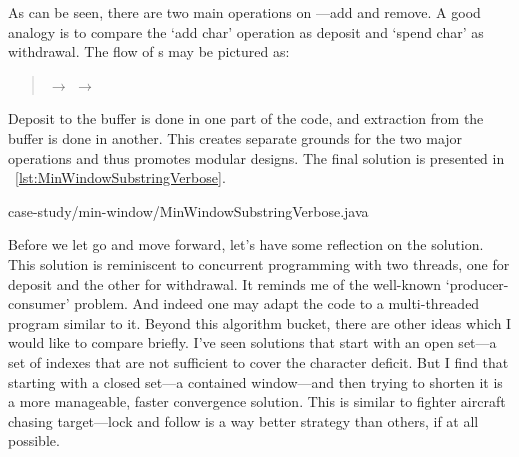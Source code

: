 As can be seen, there are two main operations on ---add and remove.
A good analogy is to compare the `add char' operation as deposit and `spend char' as withdrawal.
The flow of s may be pictured as:
\begin{quote}
     $\rightarrow$  $\rightarrow$ 
\end{quote}
Deposit to the buffer is done in one part of the code, and extraction from the buffer is done in
another.
This creates separate grounds for the two major operations and thus promotes modular designs.
The final solution is presented in ~\autoref{lst:MinWindowSubstringVerbose}.


{case-study/min-window/MinWindowSubstringVerbose.java}

Before we let go and move forward, let's have some reflection on the solution.
This solution is reminiscent to concurrent programming with two threads, one for deposit
and the other for withdrawal.
It reminds me of the well-known `producer-consumer' problem.
And indeed one may adapt the code to a multi-threaded program similar to it.
Beyond this algorithm bucket, there are other ideas which I would like to compare briefly.
I've seen solutions that start with an open set---a set of indexes that are not
sufficient to cover the character deficit.
But I find that starting with a closed set---a contained window---and then trying
to shorten it is a more manageable, faster convergence solution.
This is similar to fighter aircraft chasing target---lock and follow is a way better strategy
than others, if at all possible.

